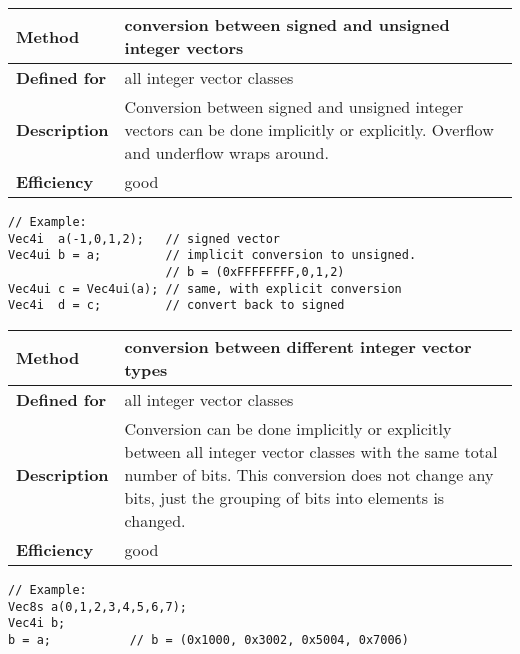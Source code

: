 \documentclass[vcl_manual.tex]{subfiles}
\begin{document}
\begin{tabular}{|p{30mm}|p{120mm}|}
\hline
\bfseries Method & conversion between signed and unsigned integer vectors \\ \hline
\bfseries Defined for & all integer vector classes \\ \hline
\bfseries Description & Conversion between signed and unsigned integer vectors can be done implicitly or explicitly. Overflow and underflow wraps around. \\ \hline
\bfseries Efficiency & good \\ \hline
\end{tabular}
\begin{lstlisting}[frame=none]
// Example:
Vec4i  a(-1,0,1,2);   // signed vector
Vec4ui b = a;         // implicit conversion to unsigned.
                      // b = (0xFFFFFFFF,0,1,2)
Vec4ui c = Vec4ui(a); // same, with explicit conversion
Vec4i  d = c;         // convert back to signed
\end{lstlisting}


\begin{tabular}{|p{30mm}|p{120mm}|}
\hline
\bfseries Method & conversion between different integer vector types \\ \hline
\bfseries Defined for & all integer vector classes \\ \hline
\bfseries Description & Conversion can be done implicitly or explicitly between all integer vector classes with the same total number of bits. This conversion does not change any bits, just the grouping of bits into elements is changed. \\ \hline
\bfseries Efficiency & good \\ \hline
\end{tabular}
\begin{lstlisting}[frame=none]
// Example:
Vec8s a(0,1,2,3,4,5,6,7);
Vec4i b;
b = a;           // b = (0x1000, 0x3002, 0x5004, 0x7006)
\end{lstlisting}
\end{document}
